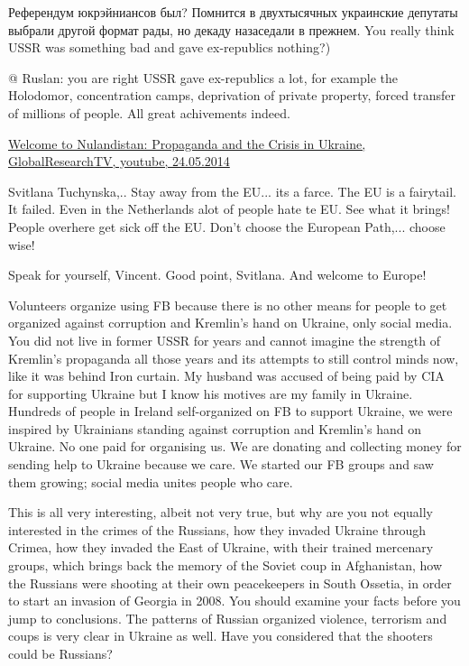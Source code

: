 \begin{itemize}
\begin{itemize} %

Референдум юкрэйниансов был? Помнится в двухтысячных украинские депутаты
выбрали другой формат рады, но декаду назаседали в прежнем. You really think
USSR was something bad and gave ex-republics nothing?)


@ Ruslan: you are right USSR gave ex-republics a lot, for example the
Holodomor, concentration camps, deprivation of private property, forced
transfer of millions of people. All great achivements indeed.


\href{https://www.youtube.com/watch?v=yu8KTiLsLJw}{%
Welcome to Nulandistan: Propaganda and the Crisis in Ukraine, GlobalResearchTV, youtube, 24.05.2014
}


Svitlana Tuchynska,.. Stay away from the EU... its a farce. The EU is a
fairytail. It failed. Even in the Netherlands alot of people hate te EU. See
what it brings! People overhere get sick off the EU. Don't choose the European
Path,... choose wise!


Speak for yourself, Vincent. Good point, Svitlana. And welcome to Europe!

\end{itemize} %


Volunteers organize using FB because there is no other means for people to get
organized against corruption and Kremlin's hand on Ukraine, only social media.
You did not live in former USSR for years and cannot imagine the strength of
Kremlin's propaganda all those years and its attempts to still control minds
now, like it was behind Iron curtain. My husband was accused of being paid by
CIA for supporting Ukraine but I know his motives are my family in Ukraine.
Hundreds of people in Ireland self-organized on FB to support Ukraine, we were
inspired by Ukrainians standing against corruption and Kremlin's hand on
Ukraine. No one paid for organising us. We are donating and collecting money
for sending help to Ukraine because we care. We started our FB groups and saw
them growing; social media unites people who care.


This is all very interesting, albeit not very true, but why are you not equally
interested in the crimes of the Russians, how they invaded Ukraine through
Crimea, how they invaded the East of Ukraine, with their trained mercenary
groups, which brings back the memory of the Soviet coup in Afghanistan, how the
Russians were shooting at their own peacekeepers in South Ossetia, in order to
start an invasion of Georgia in 2008. You should examine your facts before you
jump to conclusions. The patterns of Russian organized violence, terrorism and
coups is very clear in Ukraine as well. Have you considered that the shooters
could be Russians?


\end{itemize}
